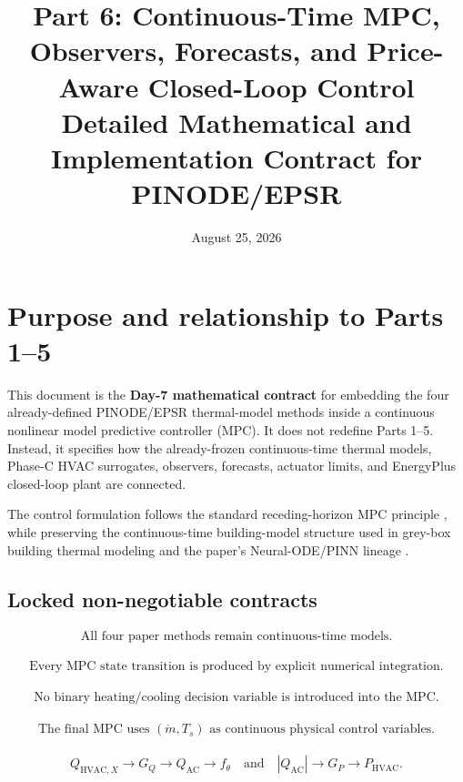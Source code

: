 \documentclass[11pt]{article}
\title{Part 6: Continuous-Time MPC, Observers, Forecasts, and Price-Aware Closed-Loop Control\\
Detailed Mathematical and Implementation Contract for PINODE/EPSR}
\author{}
\date{August 25, 2026}
\newcommand{\Ts}{T_s}
\newcommand{\mdot}{\dot m}
\newcommand{\QAC}{Q_{\mathrm{AC}}}
\newcommand{\QHX}{Q_{\mathrm{HVAC},X}}
\newcommand{\PHVAC}{P_{\mathrm{HVAC}}}
\begin{document}
\maketitle

\section*{Purpose and relationship to Parts 1--5}

This document is the \textbf{Day-7 mathematical contract} for embedding the four already-defined
PINODE/EPSR thermal-model methods inside a continuous nonlinear model predictive controller (MPC).
It does not redefine Parts 1--5.  Instead, it specifies how the already-frozen continuous-time
thermal models, Phase-C HVAC surrogates, observers, forecasts, actuator limits, and EnergyPlus
closed-loop plant are connected.

The control formulation follows the standard receding-horizon MPC principle
\citep{garcia1989mpc,rawlings2026mpc,drgona2020all,killian2016ten}, while preserving the
continuous-time building-model structure used in grey-box building thermal modeling
\citep{bacher2011heat} and the paper's Neural-ODE/PINN lineage
\citep{chen2018node,raissi2019pinn}.

\subsection*{Locked non-negotiable contracts}

\begin{align}
\boxed{\text{All four paper methods remain continuous-time models.}}
\end{align}

\begin{align}
\boxed{\text{Every MPC state transition is produced by explicit numerical integration.}}
\end{align}

\begin{align}
\boxed{\text{No binary heating/cooling decision variable is introduced into the MPC.}}
\end{align}

\begin{align}
\boxed{\text{The final MPC uses }(\mdot,\Ts)\text{ as continuous physical control variables.}}
\end{align}

\begin{align}
\boxed{\QHX\rightarrow G_Q\rightarrow\QAC\rightarrow f_\theta
\quad\text{and}\quad
|\QAC|\rightarrow G_P\rightarrow\PHVAC.}
\end{align}
\end{document}

